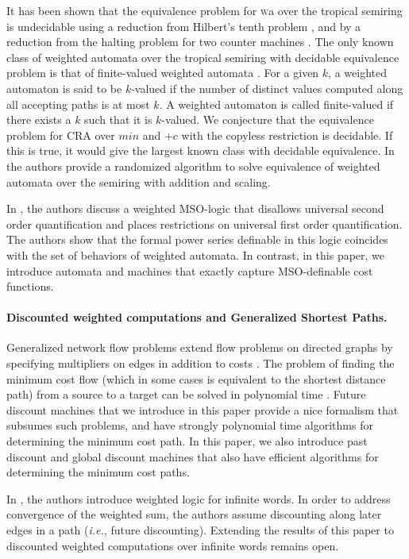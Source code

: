 \documentclass[11pt]{article}
\newcommand{\EDWA}{{CRA}\xspace}
\newcommand{\WA}{{\sc\textsc wa}\xspace}
\newcommand{\ie}{{\em i.e.}\xspace}
\begin{document}
It has been shown that the equivalence problem for \WA over the tropical
semiring is undecidable using a reduction from Hilbert's tenth problem
\cite{krob_equality_1992}, and by a reduction from the halting problem for
two counter machines \cite{almagor_what_2011}. The only known class of
weighted automata over the tropical semiring with decidable equivalence problem is that of
finite-valued weighted automata \cite{weber_finite_1994}. For a given $k$,
a weighted automaton is said to be $k$-valued if the number of distinct
values computed along all accepting paths is at most $k$. A weighted
automaton is called finite-valued if there exists a $k$ such that it is
$k$-valued.  We conjecture that the equivalence problem for \EDWA over
$min$ and $+c$ with the copyless restriction is decidable. If this is
true, it would give the largest known class with decidable equivalence.
In \cite{Kiefer} the authors provide a randomized algorithm
to solve equivalence of weighted automata over the semiring with addition and
scaling.

In \cite{droste_weighted_2005}, the authors discuss a weighted
MSO-logic that disallows universal second order quantification and
places restrictions on universal first order quantification. The
authors show that the formal power series definable in this logic
coincides with the set of behaviors of weighted automata. In contrast,
in this paper, we introduce automata and machines that exactly capture
MSO-definable cost functions.

\paragraph{Discounted weighted computations and Generalized Shortest Paths.}
Generalized network flow problems extend flow problems on directed
graphs by specifying multipliers on edges in addition to costs
\cite{goldberg_combinatorial_1988, oldham_combinatorial_1999}.  The
problem of finding the minimum cost flow (which in some cases is
equivalent to the shortest distance path) from a source to a target
can be solved in polynomial time \cite{oldham_combinatorial_1999,
batagelj_generalized_2000}.  Future discount machines that we
introduce in this paper provide a nice formalism that subsumes such
problems, and have strongly polynomial time algorithms for determining
the minimum cost path.  In this paper, we also introduce past discount
and global discount machines that also have efficient algorithms for
determining the minimum cost paths.

In \cite{droste_weighted_2009}, the authors introduce weighted logic
for infinite words. In order to address convergence of the weighted
sum, the authors assume discounting along later edges in a path (\ie,
future discounting). Extending the results of this paper to discounted
weighted computations over infinite words remains open.
\end{document}
